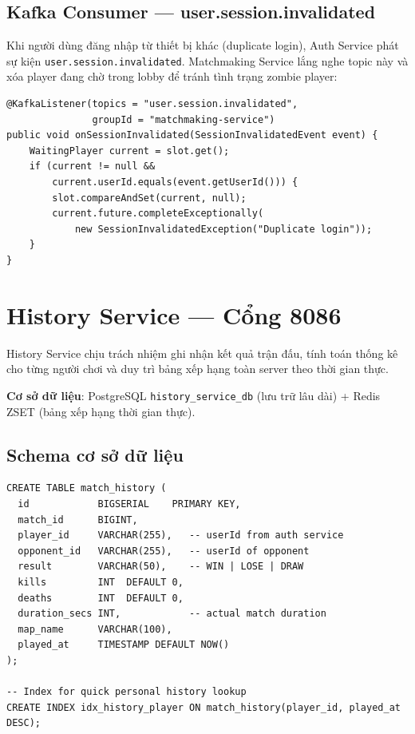 \documentclass[12pt,a4paper]{report}
\newcommand{\topic}[1]{\texttt{\textcolor{micropurple}{#1}}}
\begin{document}
\subsection{Kafka Consumer --- user.session.invalidated}

Khi người dùng đăng nhập từ thiết bị khác (duplicate login), Auth Service phát sự kiện \topic{user.session.invalidated}. Matchmaking Service lắng nghe topic này và xóa player đang chờ trong lobby để tránh tình trạng zombie player:

\begin{lstlisting}[style=javaStyle, caption={Xử lý sự kiện đăng nhập trùng session}, label={lst:sessioninvalidated}]
@KafkaListener(topics = "user.session.invalidated",
               groupId = "matchmaking-service")
public void onSessionInvalidated(SessionInvalidatedEvent event) {
    WaitingPlayer current = slot.get();
    if (current != null &&
        current.userId.equals(event.getUserId())) {
        slot.compareAndSet(current, null);
        current.future.completeExceptionally(
            new SessionInvalidatedException("Duplicate login"));
    }
}
\end{lstlisting}

\section{History Service --- Cổng 8086}

History Service chịu trách nhiệm ghi nhận kết quả trận đấu, tính toán thống kê cho từng người chơi và duy trì bảng xếp hạng toàn server theo thời gian thực.

\textbf{Cơ sở dữ liệu}: PostgreSQL \texttt{history\_service\_db} (lưu trữ lâu dài) + Redis ZSET (bảng xếp hạng thời gian thực).

\subsection{Schema cơ sở dữ liệu}

\begin{lstlisting}[style=bashStyle, caption={Schema bảng match\_history}, label={lst:historyschema}]
CREATE TABLE match_history (
  id            BIGSERIAL    PRIMARY KEY,
  match_id      BIGINT,
  player_id     VARCHAR(255),   -- userId from auth service
  opponent_id   VARCHAR(255),   -- userId of opponent
  result        VARCHAR(50),    -- WIN | LOSE | DRAW
  kills         INT  DEFAULT 0,
  deaths        INT  DEFAULT 0,
  duration_secs INT,            -- actual match duration
  map_name      VARCHAR(100),
  played_at     TIMESTAMP DEFAULT NOW()
);

-- Index for quick personal history lookup
CREATE INDEX idx_history_player ON match_history(player_id, played_at DESC);
\end{lstlisting}
\end{document}
